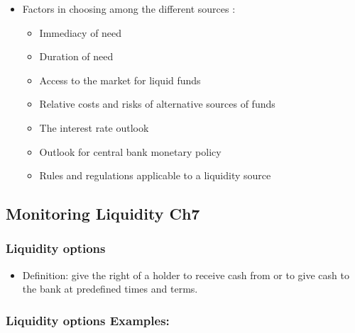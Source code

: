 \begin{itemize}
\item Factors in choosing among the different sources :
    \begin{itemize}
    \item Immediacy of need
    \item Duration of need
    \item Access to the market for liquid funds
    \item Relative costs and risks of alternative sources of funds
    \item The interest rate outlook
    \item Outlook for central bank monetary policy
    \item Rules and regulations applicable to a liquidity source
    \end{itemize}
\end{itemize}






\subsection{Monitoring Liquidity Ch7}


\subsubsection{Liquidity options}

\begin{itemize}
  \item Definition: give the right of a holder to receive cash from or to give cash to the bank at predefined times and terms.
\end{itemize}


\subsubsection{Liquidity options Examples:}

